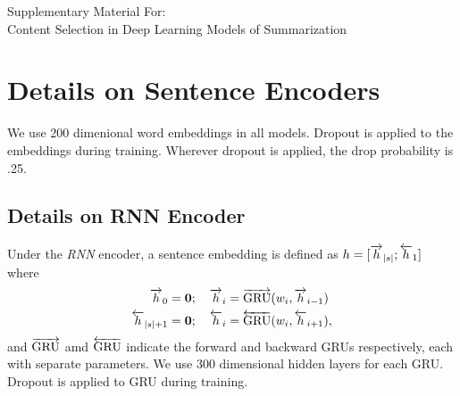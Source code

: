 \begin{centering}
  \Large
  Supplementary Material For:\\
  Content Selection in Deep Learning Models of Summarization\\

\end{centering}

  \section{Details on Sentence Encoders} \label{app:sentencoders}

  We use 200 dimenional word embeddings \wordEmb[i] in all models.
  Dropout is applied to the embeddings during training. 
  Wherever dropout is applied, the drop probability is .25.

\subsection{Details on RNN Encoder} \label{app:rnnencoder}
  
Under the \textit{RNN} encoder, a sentence embedding is defined as
$\sentEmb = [\rSentEmb[\sentSize]; \lSentEmb[1]]$
where 
\begin{align} 
  \rSentEmb[0] = \mathbf{0} &;\quad 
       \rSentEmb[i] = \rgru(\wordEmb[i], \rSentEmb[i-1]) \\
  \lSentEmb[\sentSize + 1] = \mathbf{0} &;\quad 
       \lSentEmb[i] = \lgru(\wordEmb[i], \lSentEmb[i+1]),
\end{align}
and $\overrightarrow{\operatorname{GRU}}$ amd $\overleftarrow{\operatorname{GRU}}$ indicate the 
forward and backward GRUs respectively, each with separate 
parameters. We use 300 dimensional hidden layers for each GRU. 
Dropout is applied to GRU during training.

